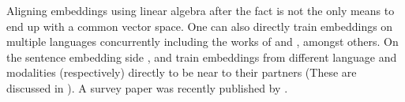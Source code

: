 \documentclass[parskip]{komatufte}
\begin{document}
Aligning embeddings using linear algebra after the fact is not the only means to end up with a common vector space.
One can also directly train embeddings on multiple languages concurrently including the works of  and , amongst others.
On the sentence embedding side , and  train embeddings from different language and modalities (respectively) directly to be near to their partners (These are discussed in ).
A survey paper was recently published by \textcite{Ruder17crosslingreview}.


\end{document}
